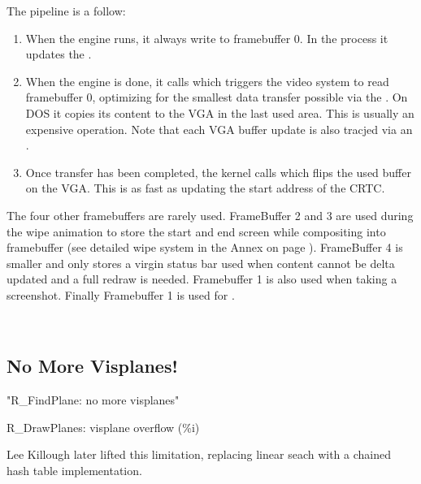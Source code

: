 \par
The pipeline is a follow:
\begin{enumerate}
\item When the engine runs, it always write to framebuffer 0. In the process it updates the .
\item When the engine is done, it calls  which triggers the video system to read framebuffer 0, optimizing for the smallest data transfer possible via the . On DOS it copies its content to the VGA in the last used area. This is usually an expensive operation. Note that each VGA buffer update is also tracjed via an .
\item Once transfer has been completed, the kernel calls   which flips the used buffer on the VGA. This is as fast as updating the start address of the CRTC.
\end{enumerate}
\par
The four other framebuffers are rarely used. FrameBuffer 2 and 3 are used during the wipe animation to store the start and end screen while compositing into framebuffer (see detailed wipe system in the Annex on page \pageref{label_melt}). FrameBuffer 4 is smaller and only stores a virgin status bar used when content cannot be delta updated and a full redraw is needed. Framebuffer 1 is also used when taking a screenshot. Finally Framebuffer 1 is used for .\\
\par
{}\\
\par
\par
\subsection{No More Visplanes!}
"R\_FindPlane: no more visplanes"\\
\par
R\_DrawPlanes: visplane overflow (\%i)\\
\par

Lee Killough later lifted this limitation, replacing linear seach with a chained hash table implementation.